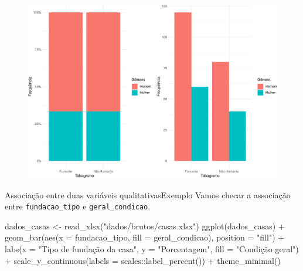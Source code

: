 \documentclass[
  10pt,
  ignorenonframetext,
]{beamer}
\newenvironment{Shaded}{\begin{snugshade}}{\end{snugshade}}
\newcommand{\AttributeTok}[1]{\textcolor[rgb]{0.40,0.45,0.13}{#1}}
\newcommand{\FunctionTok}[1]{\textcolor[rgb]{0.28,0.35,0.67}{#1}}
\newcommand{\NormalTok}[1]{\textcolor[rgb]{0.00,0.23,0.31}{#1}}
\newcommand{\OtherTok}[1]{\textcolor[rgb]{0.00,0.23,0.31}{#1}}
\newcommand{\SpecialCharTok}[1]{\textcolor[rgb]{0.37,0.37,0.37}{#1}}
\newcommand{\StringTok}[1]{\textcolor[rgb]{0.13,0.47,0.30}{#1}}
\begin{document}
\begin{frame}
\begin{figure}

{\centering \includegraphics[width=1\textwidth,height=\textheight]{exploracao-visualizacao_files/figure-beamer/sem associação-1.pdf}

}

\end{figure}
\end{frame}

\begin{frame}[fragile]{Associação entre duas variáveis
qualitativas\newline Exemplo}
\protect\hypertarget{associauxe7uxe3o-entre-duas-variuxe1veis-qualitativasexemplo}{}
Vamos checar a associação entre \texttt{fundacao\_tipo} e
\texttt{geral\_condicao}.

\vspace{0.5cm}

\small

\begin{Shaded}
\begin{Highlighting}[]
\NormalTok{dados\_casas }\OtherTok{\textless{}{-}} \FunctionTok{read\_xlsx}\NormalTok{(}\StringTok{"dados/brutos/casas.xlsx"}\NormalTok{)}
\FunctionTok{ggplot}\NormalTok{(dados\_casas) }\SpecialCharTok{+}
  \FunctionTok{geom\_bar}\NormalTok{(}\FunctionTok{aes}\NormalTok{(}\AttributeTok{x =}\NormalTok{ fundacao\_tipo, }\AttributeTok{fill =}\NormalTok{ geral\_condicao),}
          \AttributeTok{position =} \StringTok{"fill"}\NormalTok{) }\SpecialCharTok{+}
  \FunctionTok{labs}\NormalTok{(}\AttributeTok{x =} \StringTok{"Tipo de fundação da casa"}\NormalTok{, }\AttributeTok{y =} \StringTok{"Porcentagem"}\NormalTok{,}
      \AttributeTok{fill =} \StringTok{"Condição geral"}\NormalTok{) }\SpecialCharTok{+}
  \FunctionTok{scale\_y\_continuous}\NormalTok{(}\AttributeTok{labels =}\NormalTok{ scales}\SpecialCharTok{::}\FunctionTok{label\_percent}\NormalTok{()) }\SpecialCharTok{+}
  \FunctionTok{theme\_minimal}\NormalTok{()}
\end{Highlighting}
\end{Shaded}

\normalsize
\end{frame}
\end{document}
